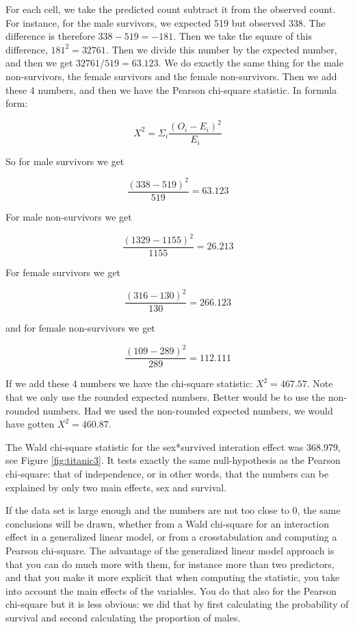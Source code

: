 \documentclass[]{book}\usepackage[]{graphicx}\usepackage[]{color}
\begin{document}
For each cell, we take the predicted count subtract it from the observed count. For instance, for the male survivors, we expected 519 but observed 338. The difference is therefore $338-519= -181$. Then we take the square of this difference, $ 181^2=32761$. Then we divide this number by the expected number, and then we get $32761/519=63.123$. We do exactly the same thing for the male non-survivors, the female survivors and the female non-survivors. Then we add these 4 numbers, and then we have the Pearson chi-square statistic. In formula form:

\begin{equation}
X^2 = \Sigma_i    \frac{(O_i-E_i)^2}{E_i}
\end{equation}


So for male survivors we get


\begin{equation}
 \frac{(338-519)^2}{519} =63.123
\end{equation}




For male non-survivors we get


\begin{equation}
 \frac{(1329-1155)^2}{1155} =26.213
\end{equation}

For female survivors we get


\begin{equation}
 \frac{(316-130)^2}{130} =266.123
\end{equation}

and for female non-survivors we get

\begin{equation}
 \frac{(109-289)^2}{289} =112.111
\end{equation}




If we add these 4 numbers we have the chi-square statistic: $X^2= 467.57$. Note that we only use the rounded expected numbers. Better would be to use the non-rounded numbers. Had we used the non-rounded expected numbers, we would have gotten $X^2 = 460.87$.

The Wald chi-square statistic for the sex*survived interation effect was 368.979, see Figure \ref{fig:titanic3}. It tests exactly the same null-hypothesis as the Pearson chi-square: that of independence, or in other words, that the numbers can be explained by only two main effects, sex and survival.

If the data set is large enough and the numbers are not too close to 0, the same conclusions will be drawn, whether from a Wald chi-square for an interaction effect in a generalized linear model, or from a crosstabulation and computing a Pearson chi-square. The advantage of the generalized linear model approach is that you can do much more with them, for instance more than two predictors, and that you make it more explicit that when computing the statistic, you take into account the main effects of the variables. You do that also for the Pearson chi-square but it is less obvious: we did that by first calculating the probability of survival and second calculating the proportion of males.
\end{document}
